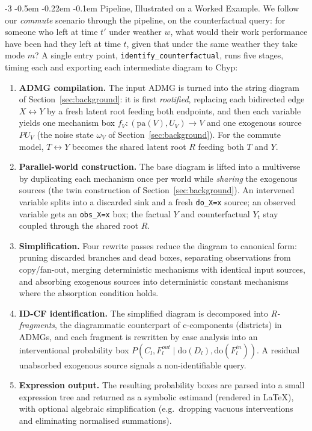 \documentclass[runningheads]{llncs}
\makeatletter
\renewcommand\paragraph{\@startsection{paragraph}{4}{\z@}%
                       {-3\p@ \@plus -2\p@ \@minus -2\p@}%
                       {-0.5em \@plus -0.22em \@minus -0.1em}%
                       {\normalfont\normalsize\bfseries}}
\makeatother
\begin{document}
\paragraph{Pipeline, Illustrated on a Worked Example.}
We follow our \emph{commute} scenario through the pipeline, on the counterfactual query: for someone who left at time \(t'\) under weather \(w\), what would their work performance have been had they left at time \(t\), given that under the same weather they take mode \(m\)? A single entry point, \texttt{identify\_counterfactual}, runs five stages, timing each and exporting each intermediate diagram to Chyp:

\begin{enumerate}
    \item \textbf{ADMG compilation.} The input ADMG is turned into the string diagram of Section~\ref{sec:background}: it is first \emph{rootified}, replacing each bidirected edge $X \leftrightarrow Y$ by a fresh latent root feeding both endpoints, and then each variable yields one mechanism box $f_V : (\mathrm{pa}(V), U_V) \to V$ and one exogenous source $PU_V$ (the noise state $\omega_V$ of Section~\ref{sec:background}). For the commute model, $T\leftrightarrow Y$ becomes the shared latent root $R$ feeding both $T$ and $Y$.
    \item \textbf{Parallel-world construction.} The base diagram is lifted into a multiverse by duplicating each mechanism once per world while \emph{sharing} the exogenous sources (the twin construction of Section~\ref{sec:background}). An intervened variable splits into a discarded sink and a fresh \texttt{do\_X=x} source; an observed variable gets an \texttt{obs\_X=x} box; the factual $Y$ and counterfactual $Y_t$ stay coupled through the shared root $R$.
    \item \textbf{Simplification.} Four rewrite passes reduce the diagram to canonical form: pruning discarded branches and dead boxes, separating observations from copy/fan-out, merging deterministic mechanisms with identical input sources, and absorbing exogenous sources into deterministic constant mechanisms where the absorption condition holds.
    \item \textbf{ID-CF identification.} The simplified diagram is decomposed into \emph{R-fragments}, the diagrammatic counterpart of c-components (districts) in ADMGs, and each fragment is rewritten by case analysis into an interventional probability box $P(C_l, F_l^{out} \mid \mathrm{do}(D_l), \mathrm{do}(F_l^{in}))$. A residual unabsorbed exogenous source signals a non-identifiable query.
    \item \textbf{Expression output.} The resulting probability boxes are parsed into a small expression tree and returned as a symbolic estimand (rendered in \LaTeX), with optional algebraic simplification (e.g.\ dropping vacuous interventions and eliminating normalised summations).
\end{enumerate}
\end{document}
